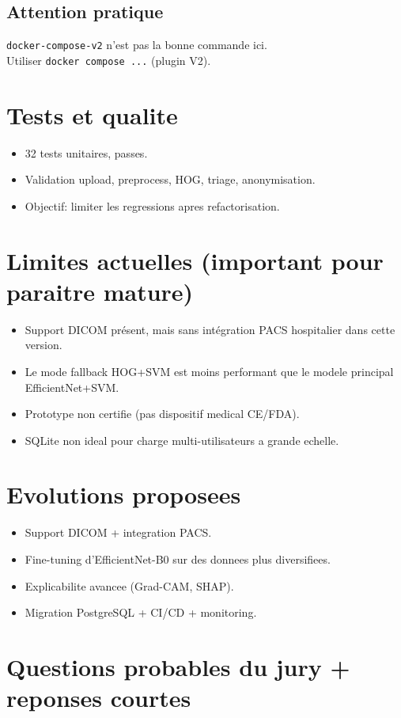 \documentclass[12pt,a4paper]{article}
\begin{document}
\subsection{Attention pratique}
\texttt{docker-compose-v2} n'est pas la bonne commande ici.\\
Utiliser \texttt{docker compose ...} (plugin V2).

\section{Tests et qualite}
\begin{itemize}
  \item 32 tests unitaires, passes.
  \item Validation upload, preprocess, HOG, triage, anonymisation.
  \item Objectif: limiter les regressions apres refactorisation.
\end{itemize}

\section{Limites actuelles (important pour paraitre mature)}
\begin{itemize}
  \item Support DICOM présent, mais sans intégration PACS hospitalier dans cette version.
  \item Le mode fallback HOG+SVM est moins performant que le modele principal EfficientNet+SVM.
  \item Prototype non certifie (pas dispositif medical CE/FDA).
  \item SQLite non ideal pour charge multi-utilisateurs a grande echelle.
\end{itemize}

\section{Evolutions proposees}
\begin{itemize}
  \item Support DICOM + integration PACS.
  \item Fine-tuning d'EfficientNet-B0 sur des donnees plus diversifiees.
  \item Explicabilite avancee (Grad-CAM, SHAP).
  \item Migration PostgreSQL + CI/CD + monitoring.
\end{itemize}

\section{Questions probables du jury + reponses courtes}
\end{document}
